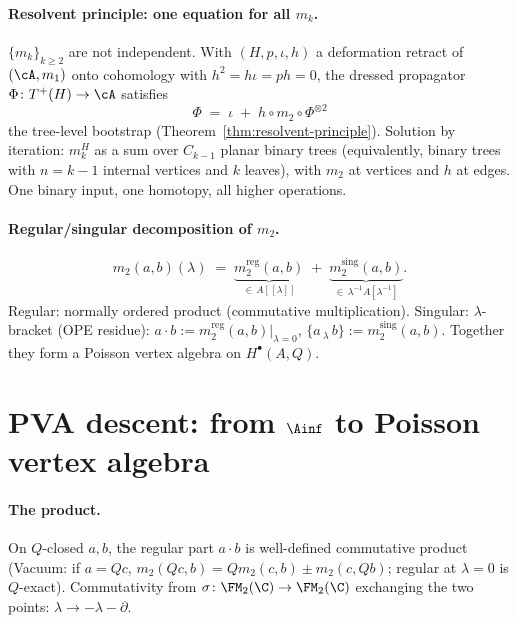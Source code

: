 \paragraph{Resolvent principle: one equation for all $m_k$.}
$\{m_k\}_{k \ge 2}$ are not independent. With $(H, p, \iota, h)$
a deformation retract of $(\cA, m_1)$ onto cohomology with
$h^2 = h\iota = ph = 0$, the dressed propagator
$\Phi\colon T^+(H) \to \cA$ satisfies
\begin{equation}
\label{eq:intro-resolvent}
\Phi \;=\; \iota \;+\; h \circ m_2 \circ \Phi^{\otimes 2}
\end{equation}
the tree-level bootstrap (Theorem~\ref{thm:resolvent-principle}).
Solution by iteration: $m_k^H$ as a sum over $C_{k-1}$ planar
binary trees (equivalently, binary trees with $n = k - 1$
internal vertices and $k$ leaves), with $m_2$ at vertices and
$h$ at edges. One binary input, one homotopy, all higher
operations.

\paragraph{Regular/singular decomposition of $m_2$.}
\begin{equation}
\label{eq:intro-reg-sing}
m_2(a,b)(\lambda) \;=\;
\underbrace{m_2^{\mathrm{reg}}(a,b)}_{\in\, A[[\lambda]]}
\;+\;
\underbrace{m_2^{\mathrm{sing}}(a,b)}_{\in\, \lambda^{-1}
A[\lambda^{-1}]}.
\end{equation}
Regular: normally ordered product (commutative multiplication).
Singular: $\lambda$-bracket (OPE residue):
$a \cdot b := m_2^{\mathrm{reg}}(a,b)|_{\lambda=0}$,
$\{a \,{}_\lambda\, b\} := m_2^{\mathrm{sing}}(a,b)$.
Together they form a Poisson vertex algebra on
$H^\bullet(A, Q)$.


\section*{PVA descent: from $\Ainf$ to Poisson vertex algebra}

\paragraph{The product.}
On $Q$-closed $a, b$, the regular part $a \cdot b$ is
well-defined commutative product (Vacuum: if $a = Qc$, $m_2(Qc,
b) = Q m_2(c,b) \pm m_2(c, Qb)$; regular at $\lambda = 0$ is
$Q$-exact). Commutativity from $\sigma\colon \FM_2(\C) \to
\FM_2(\C)$ exchanging the two points: $\lambda \to -\lambda - \partial$.

